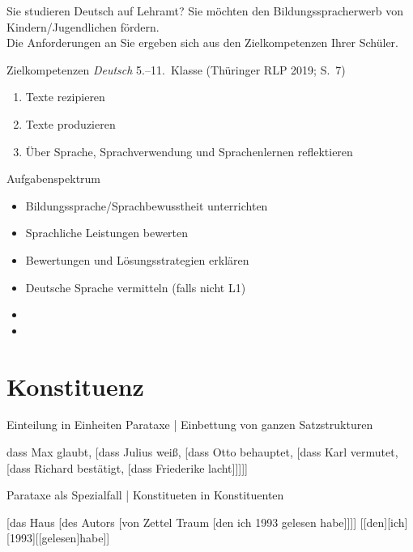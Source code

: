 \begin{frame}
  {Sie studieren Deutsch auf Lehramt?}
  \onslide<+->
  \onslide<+->
  Sie möchten den \alert{Bildungsspracherwerb} von Kindern\slash Jugendlichen fördern.\\
  Die Anforderungen an Sie ergeben sich aus den \alert{Zielkompetenzen Ihrer Schüler}.\\
  \onslide<+->
  \Viertelzeile 
  \begin{block}
    {Zielkompetenzen \textit{Deutsch} 5.--11.~Klasse (Thüringer RLP 2019; S.~7)}
    \begin{enumerate}[<+->]
      \item Texte rezipieren
      \item Texte produzieren
      \item \alert{Über Sprache, Sprachverwendung und Sprachenlernen reflektieren}
    \end{enumerate}
  \end{block}
  \onslide<+->
  Aufgabenspektrum\\
  \Viertelzeile 
  \begin{itemize}[<+->]
    \item \alert{Bildungssprache\slash Sprachbewusstheit} unterrichten
    \item Sprachliche Leistungen  bewerten
    \item Bewertungen und Lösungsstrategien \alert{erklären}
    \item \alert{Deutsche Sprache} vermitteln (falls nicht L1)
    \item {}
    \item {}
  \end{itemize}
\end{frame}




\section{Konstituenz}

\begin{frame}
  {Einteilung in Einheiten}
  \onslide<+->
  \onslide<+->
  \alert{Parataxe} | Einbettung von ganzen Satzstrukturen\\
  \Viertelzeile
  \onslide<+->
  \begin{exe}
    \ex dass Max glaubt, [dass Julius weiß, [dass Otto behauptet, [dass Karl vermutet, [dass Richard bestätigt, [dass Friederike lacht]]]]]
  \end{exe}
  \onslide<+->
  \Zeile
  Parataxe als Spezialfall | \alert{Konstitueten in Konstituenten}\\
  \onslide<+->
  \Viertelzeile
  \begin{exe}
    \ex {}[das Haus [des Autors [von Zettel Traum [den ich 1993 gelesen habe]]]]
    \ex {}[[den][ich][1993][[gelesen]habe]]
  \end{exe}
\end{frame}

